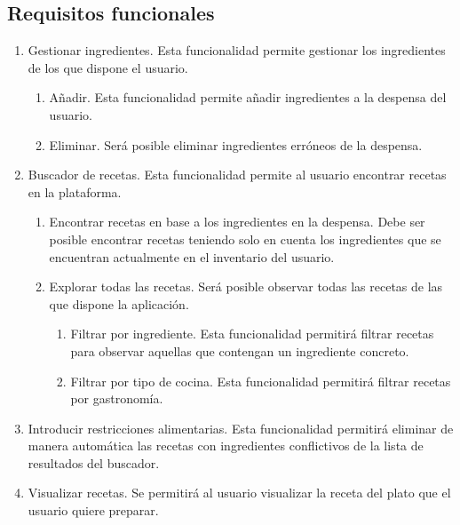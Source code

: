 \subsection{Requisitos funcionales}
\begin{enumerate}[label=RF\arabic*,leftmargin=2cm]
    \item Gestionar ingredientes. Esta funcionalidad permite gestionar los ingredientes de los que dispone el usuario.
    \begin{enumerate}[label=RF1.\arabic*] 
        \item Añadir. Esta funcionalidad permite añadir ingredientes a la despensa del usuario.
        \item Eliminar. Será posible eliminar ingredientes erróneos de la despensa. 
    \end{enumerate}
    \item Buscador de recetas. Esta funcionalidad permite al usuario encontrar recetas en la plataforma.
    \begin{enumerate}[label=RF2.\arabic*]
        \item Encontrar recetas en base a los ingredientes en la despensa. Debe ser posible encontrar recetas teniendo solo en cuenta los ingredientes que se encuentran actualmente en el inventario del usuario.
        \item Explorar todas las recetas. Será posible observar todas las recetas de las que dispone la aplicación.
        \begin{enumerate}[label=RF2.2.\arabic*]
            \item Filtrar por ingrediente. Esta funcionalidad permitirá filtrar recetas para observar aquellas que contengan un ingrediente concreto.
            \item Filtrar por tipo de cocina. Esta funcionalidad permitirá filtrar recetas por gastronomía. 
        \end{enumerate}
    \end{enumerate}
    \item Introducir restricciones alimentarias. Esta funcionalidad permitirá eliminar de manera automática las recetas con ingredientes conflictivos de la lista de resultados del buscador.
    \item Visualizar recetas. Se permitirá al usuario visualizar la receta del plato que el usuario quiere preparar.
\end{enumerate} 

